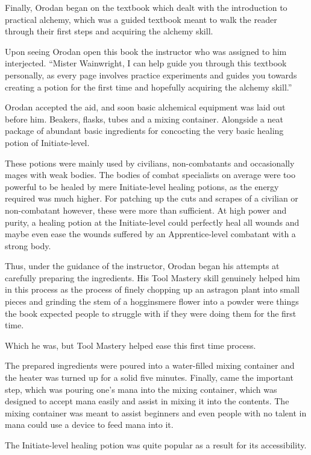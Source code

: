 \documentclass[a4paper,10pt]{book}
\begin{document}
Finally, Orodan began on the textbook which dealt with the introduction to practical alchemy, which was a guided textbook meant to walk the reader through their first steps and acquiring the alchemy skill.\par
Upon seeing Orodan open this book the instructor who was assigned to him interjected. “Mister Wainwright, I can help guide you through this textbook personally, as every page involves practice experiments and guides you towards creating a potion for the first time and hopefully acquiring the alchemy skill.”\par
Orodan accepted the aid, and soon basic alchemical equipment was laid out before him. Beakers, flasks, tubes and a mixing container. Alongside a neat package of abundant basic ingredients for concocting the very basic healing potion of Initiate-level.\par
These potions were mainly used by civilians, non-combatants and occasionally mages with weak bodies. The bodies of combat specialists on average were too powerful to be healed by mere Initiate-level healing potions, as the energy required was much higher. For patching up the cuts and scrapes of a civilian or non-combatant however, these were more than sufficient. At high power and purity, a healing potion at the Initiate-level could perfectly heal all wounds and maybe even ease the wounds suffered by an Apprentice-level combatant with a strong body.\par
Thus, under the guidance of the instructor, Orodan began his attempts at carefully preparing the ingredients. His Tool Mastery skill genuinely helped him in this process as the process of finely chopping up an astragon plant into small pieces and grinding the stem of a hogginsmere flower into a powder were things the book expected people to struggle with if they were doing them for the first time.\par
Which he was, but Tool Mastery helped ease this first time process.\par
The prepared ingredients were poured into a water-filled mixing container and the heater was turned up for a solid five minutes. Finally, came the important step, which was pouring one’s mana into the mixing container, which was designed to accept mana easily and assist in mixing it into the contents. The mixing container was meant to assist beginners and even people with no talent in mana could use a device to feed mana into it.\par
The Initiate-level healing potion was quite popular as a result for its accessibility.\par
\end{document}
